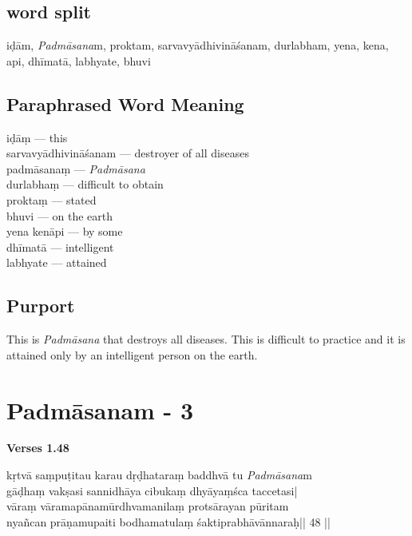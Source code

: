 \subsection*{word split}

iḍām,  \textit{Padmāsana}m, proktam, sarvavyādhivināśanam,  durlabham, yena, kena, api, dhīmatā, labhyate, bhuvi

\subsection*{Paraphrased Word Meaning}

\begin{multicols}{2}
iḍāṃ ---  this  \\
sarvavyādhivināśanam --- destroyer of all diseases  \\
padmāsanaṃ ---  \textit{Padmāsana} \\
durlabhaṃ ---  difficult to obtain \\ 
proktaṃ ---  stated  \\
bhuvi --- on the earth  \\
yena kenāpi ---  by some  \\
dhīmatā ---  intelligent  \\
labhyate --- attained
\end{multicols}

\subsection*{Purport}

This is \textit{Padmāsana} that destroys all diseases. This is difficult to practice and it is attained only by an intelligent person on the earth.

\section*{Padmāsanam - 3}

\noindent \textbf{Verses 1.48}

\begin{shloka}
kṛtvā saṃpuṭitau karau  dṛḍhataraṃ baddhvā tu \textit{Padmāsana}m\\
gāḍhaṃ vakṣasi sannidhāya cibukaṃ dhyāyaṃśca taccetasi|\\
vāraṃ vāramapānamūrdhvamanilaṃ protsārayan pūritam\\
nyañcan prāṇamupaiti bodhamatulaṃ śaktiprabhāvānnaraḥ|| 48 ||
\end{shloka}

